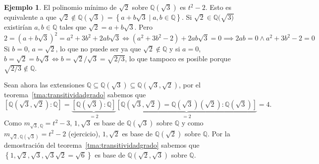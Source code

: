 \documentclass[10pt, spanish]{report}
\theoremstyle{definition}
\newtheorem*{ej}{Ejemplo}
\newcommand{\Q}{\mathbb{Q}}
\begin{document}
\begin{ej}
    El polinomio mínimo de $\sqrt{2}$ sobre $\Q(\sqrt{3})$ es
    $t^2-2$. Esto es equivalente a que
    $\sqrt{2}\not\in\Q(\sqrt{3})=\left\{ a+b\sqrt{3}\mid a,b\in\Q\right\}$. Si
    $\sqrt{2}\in\Q(\sqrt{3)}$ existirían $a,b\in\Q$ tales que
    $\sqrt{2}=a+b\sqrt{3}$. Pero \[2=(a+b\sqrt{3})^2=a^2+3b^2+2ab\sqrt{3}
        \Leftrightarrow (a^2+3b^2-2)+2ab\sqrt{3}=0 \implies 2ab=0 \wedge
        a^2+3b^2-2=0\]
     Si $b=0$, $a=\sqrt{2}$, lo que no puede ser ya que $\sqrt{2}\not\in\Q$ y
     si $a=0$, $b=\sqrt{2}=b\sqrt{3} \Leftrightarrow b={\sqrt{2}}/{\sqrt{3}}=
     \sqrt{{2}/{3}}$, lo que tampoco es posible porque $\sqrt{{2}/{3}}\not\in\Q$.

    Sean ahora las extensiones $\Q\subseteq\Q(\sqrt{3})\subseteq
    \Q(\sqrt{3},\sqrt{2})$, por el teorema~\ref{tma:transitividadgrado} sabemos que
    \[[\Q(\sqrt{3},\sqrt{2}):\Q]=\underbrace{[\Q(\sqrt{3}):\Q]}_{=2}\underbrace{
      [\Q(\sqrt{3},\sqrt{2})=\Q(\sqrt{3})(\sqrt{2}):\Q(\sqrt{3})]}_{=2}=4.\]
    Como $m_{\sqrt{3},\Q}=t^2-3$, $1,\sqrt{3}$ es base de $\Q(\sqrt{3})$ sobre
    $\Q$ y como $m_{\sqrt{2},\Q(\sqrt{3})}=t^2-2$ (ejercicio), $1,\sqrt{2}$ es
    base de $\Q(\sqrt{2})$ sobre $\Q$. Por la demostración del
    teorema~\ref{tma:transitividadgrado} sabemos que $\left\{1,\sqrt{2},\sqrt{3},
    \sqrt{3}\sqrt{2}=\sqrt{6}\right\}$ es base de $\Q(\sqrt{2},\sqrt{3})$ sobre
    $\Q$.
\end{ej}
\end{document}
